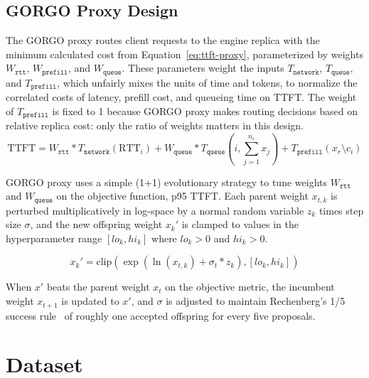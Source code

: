 \documentclass{article}
\begin{document}
\bigskip
\subsection{GORGO Proxy Design}

The GORGO proxy routes client requests to the engine replica with the minimum calculated cost from Equation~\ref{eq:ttft-proxy}, parameterized by weights $W_{\texttt{rtt}}$, $W_{\texttt{prefill}}$, and $W_{\texttt{queue}}$. These parameters weight the inputs $T_{\texttt{network}}$, $T_{\texttt{queue}}$, and $T_{\texttt{prefill}}$, which unfairly mixes the units of time and tokens, to normalize the correlated costs of latency, prefill cost, and queueing time on TTFT. The weight of $T_{\texttt{prefill}}$ is fixed to 1 because GORGO proxy makes routing decisions based on relative replica cost: only the ratio of weights matters in this design.
\begin{equation}
\mathrm{TTFT} = W_{\texttt{rtt}} * T_{\texttt{network}}(\mathrm{RTT}_i) + W_{\texttt{queue}} * T_{\texttt{queue}}\left(i, \sum_{j=1}^{n_r} x_j\right) + T_{\texttt{prefill}}(x_r \setminus c_i)
\label{eq:score}
\end{equation}

GORGO proxy uses a simple (1+1) evolutionary strategy to tune weights $W_{\texttt{rtt}}$ and $W_{\texttt{queue}}$ on the objective function, p95 TTFT.
Each parent weight $x_{t,k}$ is perturbed multiplicatively in log-space by a normal random variable $z_k$ times step size $\sigma$, and the new offspring weight $x_k'$ is clamped to values in the hyperparameter range $[lo_k, hi_k]$ where $lo_k > 0$ and $hi_k > 0$.

\begin{equation}
x_k' = \mathrm{clip}\left(\exp(\ln(x_{t,k}) + \sigma_t * z_k), [lo_k, hi_k]\right)
\end{equation}

When $x'$ beats the parent weight $x_t$ on the objective metric, the incumbent weight $x_{t+1}$ is updated to $x'$, and $\sigma$ is adjusted to maintain Rechenberg's 1/5 success rule~\citep{rechenberg1973} of roughly one accepted offspring for every five proposals.

\section{Dataset}
\label{sec:characterization}
\end{document}
